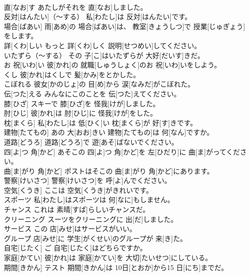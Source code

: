 \documentclass[8pt]{extreport}
\begin{document}
\begin{CJK}{UTF8}{min}
\\	直[なお]す	あたしがそれを 直[なお]しました。		
\\	反対[はんたい]（～する）	私[わたし]は 反対[はんたい]です。		
\\	場合[ばあい]	雨[あめ]の 場合[ばあい]は、 教室[きょうしつ]で 授業[じゅぎょう]をします。		
\\	詳[くわ]しい	もっと 詳[くわ]しく 説明[せつめい]してください。		
\\	いたずら（～する）	その 子[こ]はいたずらが 大好[だいす]きだ。		
\\	お 祝[いわ]い	彼[かれ]の 就職[しゅうしょく]のお 祝[いわ]いをしよう。		
\\	くし	彼[かれ]はくしで 髪[かみ]をとかした。		
\\	こぼれる	彼女[かのじょ]の 目[め]から 涙[なみだ]がこぼれた。		
\\	伝[つた]える	みんなにこのことを 伝[つた]えてください。		
\\	膝[ひざ]	スキーで 膝[ひざ]を 怪我[けが]しました。		
\\	肘[ひじ]	彼[かれ]は 肘[ひじ]に 怪我[けが]をした。		
\\	枕[まくら]	私[わたし]は 低[ひく]い 枕[まくら]が 好[す]きです。		
\\	建物[たてもの]	あの 大[おお]きい 建物[たてもの]は 何[なん]ですか。		
\\	道路[どうろ]	道路[どうろ]で 遊[あそ]ばないでください。		
\\	四[よ]つ 角[かど]	あそこの 四[よ]つ 角[かど]を 左[ひだり]に 曲[ま]がってください。		
\\	曲[ま]がり 角[かど]	ポストはそこの 曲[ま]がり 角[かど]にあります。		
\\	警察[けいさつ]	警察[けいさつ]を 呼[よ]んでください。		
\\	空気[くうき]	ここは 空気[くうき]がきれいです。		
\\	スポーツ	私[わたし]はスポーツは 何[なに]もしません。		
\\	チャンス	これは 素晴[すば]らしいチャンスだ。		
\\	クリーニング	スーツをクリーニングに 出[だ]しました。		
\\	サービス	この 店[みせ]はサービスがいい。		
\\	グループ	店[みせ]に 学生[がくせい]のグループが 来[き]た。		
\\	自宅[じたく]	ご 自宅[じたく]はどちらですか。		
\\	家庭[かてい]	彼[かれ]は 家庭[かてい]を 大切[たいせつ]にしている。		
\\	期間[きかん]	テスト 期間[きかん]は 10日[とおか]から15 日[にち]までだ。		

\end{CJK}
\end{document}
